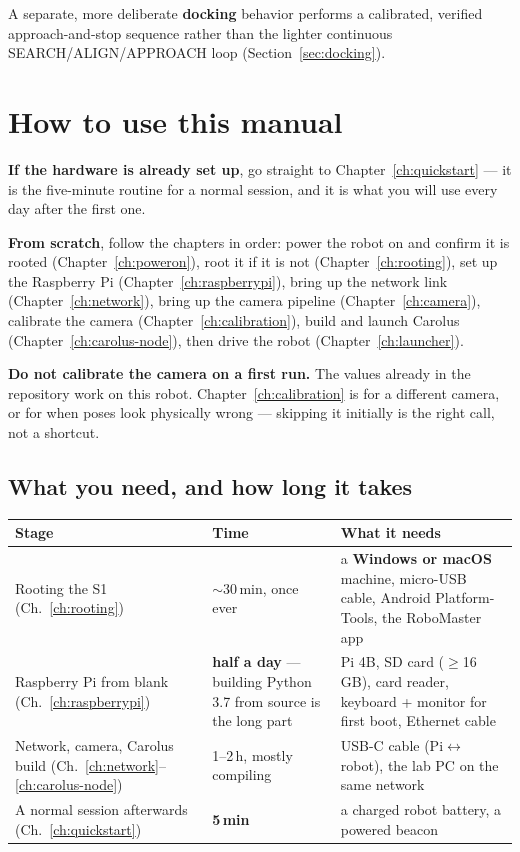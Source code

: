 \documentclass[11pt]{report}
\begin{document}
A separate, more deliberate \textbf{docking} behavior performs a calibrated,
verified approach-and-stop sequence rather than the lighter continuous
SEARCH/ALIGN/APPROACH loop (Section~\ref{sec:docking}).

\section{How to use this manual}

\textbf{If the hardware is already set up}, go straight to
Chapter~\ref{ch:quickstart} --- it is the five-minute routine for a normal
session, and it is what you will use every day after the first one.

\textbf{From scratch}, follow the chapters in order: power the robot on and
confirm it is rooted (Chapter~\ref{ch:poweron}), root it if it is not
(Chapter~\ref{ch:rooting}), set up the Raspberry Pi
(Chapter~\ref{ch:raspberrypi}), bring up the network link
(Chapter~\ref{ch:network}), bring up the camera pipeline
(Chapter~\ref{ch:camera}), calibrate the camera
(Chapter~\ref{ch:calibration}), build and launch Carolus
(Chapter~\ref{ch:carolus-node}), then drive the robot
(Chapter~\ref{ch:launcher}).

\textbf{Do not calibrate the camera on a first run.} The values already in
the repository work on this robot. Chapter~\ref{ch:calibration} is for a
different camera, or for when poses look physically wrong --- skipping it
initially is the right call, not a shortcut.

\subsection*{What you need, and how long it takes}

\begin{center}
\begin{tabular}{p{}p{}p{}}
\toprule
Stage & Time & What it needs \\
\midrule
Rooting the S1 (Ch.~\ref{ch:rooting})
 & $\sim$30\,min, once ever
 & a \textbf{Windows or macOS} machine, micro-USB cable, Android
   Platform-Tools, the RoboMaster app \\
\addlinespace
Raspberry Pi from blank (Ch.~\ref{ch:raspberrypi})
 & \textbf{half a day} --- building Python 3.7 from source is the long part
 & Pi 4B, SD card ($\ge$16\,GB), card reader, keyboard + monitor for first
   boot, Ethernet cable \\
\addlinespace
Network, camera, Carolus build (Ch.~\ref{ch:network}--\ref{ch:carolus-node})
 & 1--2\,h, mostly compiling
 & USB-C cable (Pi$\leftrightarrow$robot), the lab PC on the same network \\
\addlinespace
A normal session afterwards (Ch.~\ref{ch:quickstart})
 & \textbf{5\,min}
 & a charged robot battery, a powered beacon \\
\bottomrule
\end{tabular}
\end{center}
\end{document}
